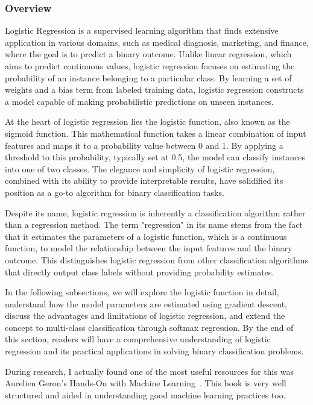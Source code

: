 \documentclass[letterpaper,10pt]{article}
\begin{document}
\subsubsection{Overview}
Logistic Regression is a supervised learning algorithm that finds extensive application in various domains, such as medical diagnosis, marketing, and finance, where the goal is to predict a binary outcome. Unlike linear regression, which aims to predict continuous values, logistic regression focuses on estimating the probability of an instance belonging to a particular class. By learning a set of weights and a bias term from labeled training data, logistic regression constructs a model capable of making probabilistic predictions on unseen instances. \par

At the heart of logistic regression lies the logistic function, also known as the sigmoid function. This mathematical function takes a linear combination of input features and maps it to a probability value between 0 and 1. By applying a threshold to this probability, typically set at 0.5, the model can classify instances into one of two classes. The elegance and simplicity of logistic regression, combined with its ability to provide interpretable results, have solidified its position as a go-to algorithm for binary classification tasks. \par

Despite its name, logistic regression is inherently a classification algorithm rather than a regression method. The term "regression" in its name stems from the fact that it estimates the parameters of a logistic function, which is a continuous function, to model the relationship between the input features and the binary outcome. This distinguishes logistic regression from other classification algorithms that directly output class labels without providing probability estimates. \par

In the following subsections, we will explore the logistic function in detail, understand how the model parameters are estimated using gradient descent, discuss the advantages and limitations of logistic regression, and extend the concept to multi-class classification through softmax regression. By the end of this section, readers will have a comprehensive understanding of logistic regression and its practical applications in solving binary classification problems.

During research, I actually found one of the most useful resources for this was Aurelien Geron's Hands-On with Machine Learning~\cite{geron2017hands-on}. This book is very well structured and aided in understanding good machine learning practices too.
\end{document}
